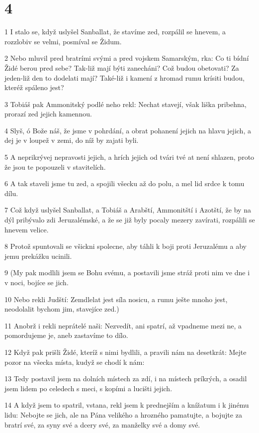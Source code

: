\chapter{4}

\par 1 I stalo se, když uslyšel Sanballat, že stavíme zed, rozpálil se hnevem, a rozzlobiv se velmi, posmíval se Židum.
\par 2 Nebo mluvil pred bratrími svými a pred vojskem Samarským, rka: Co ti bídní Židé berou pred sebe? Tak-liž mají býti zanecháni? Což budou obetovati? Za jeden-liž den to dodelati mají? Také-liž i kamení z hromad rumu krísiti budou, kteréž spáleno jest?
\par 3 Tobiáš pak Ammonitský podlé neho rekl: Nechat stavejí, však liška pribehna, prorazí zed jejich kamennou.
\par 4 Slyš, ó Bože náš, že jsme v pohrdání, a obrat pohanení jejich na hlavu jejich, a dej je v loupež v zemi, do níž by zajati byli.
\par 5 A neprikrývej nepravosti jejich, a hrích jejich od tvári tvé at není shlazen, proto že jsou te popouzeli v stavitelích.
\par 6 A tak staveli jsme tu zed, a spojili všecku až do polu, a mel lid srdce k tomu dílu.
\par 7 Což když uslyšel Sanballat, a Tobiáš a Arabští, Ammonitští i Azotští, že by na dýl pribývalo zdi Jeruzalémské, a že se již byly pocaly mezery zavírati, rozpálili se hnevem velice.
\par 8 Protož spuntovali se všickni spolecne, aby táhli k boji proti Jeruzalému a aby jemu prekážku ucinili.
\par 9 (My pak modlili jsem se Bohu svému, a postavili jsme stráž proti nim ve dne i v noci, bojíce se jich.
\par 10 Nebo rekli Judští: Zemdlelat jest síla nosicu, a rumu ješte mnoho jest, neodolalit bychom jim, stavejíce zed.)
\par 11 Anobrž i rekli neprátelé naši: Nezvedít, ani spatrí, až vpadneme mezi ne, a pomordujeme je, aneb zastavíme to dílo.
\par 12 Když pak prišli Židé, kteríž s nimi bydlili, a pravili nám na desetkrát: Mejte pozor na všecka místa, kudyž se chodí k nám:
\par 13 Tedy postavil jsem na dolních místech za zdí, i na místech príkrých, a osadil jsem lidem po celedech s meci, s kopími a lucišti jejich.
\par 14 A když jsem to spatril, vstana, rekl jsem k prednejším a knížatum i k jinému lidu: Nebojte se jich, ale na Pána velikého a hrozného pamatujte, a bojujte za bratrí své, za syny své a dcery své, za manželky své a domy své.
